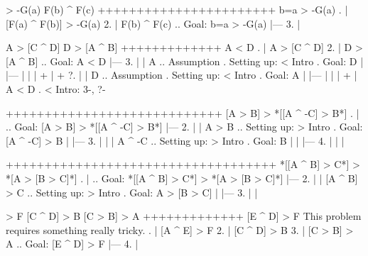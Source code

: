 \argument
 [F(a) ^ F(b)] > -G(a)
 F(b) ^ F(c)
+++++++++++++++++++++++
 b=a > -G(a)
\endargument
        \answer
        . | [F(a) ^ F(b)] > -G(a)
         2. | F(b) ^ F(c)    ..  Goal: b=a > -G(a)
            |---
         3. | 
        \endfitchproof
        \endanswer

\argument
 A > [C ^ D]
 D > [A ^ B]
+++++++++++++
 A < D
\endargument
        \answer
        . | A > [C ^ D]
         2. | D > [A ^ B]  ..  Goal: A < D
            |---
         3. |   | A        ..  Assumption  .  Setting up: < Intro  .  Goal: D
            |   |---
            |   | 
            |   +
            |   +
         ?. |   | D        ..  Assumption  .  Setting up: < Intro  .  Goal: A
            |   |---
            |   | 
            |   +
            | A < D        .  < Intro: 3-, ?-
        \endfitchproof
        \endanswer

\argument

++++++++++++++++++++++++++++
 [A > B] > *[[A ^ -C] > B*]
\endargument
        \answer
        . |                 ..  Goal: [A > B] > *[[A ^ -C] > B*]
            |---
         2. |   | A > B       ..  Setting up: > Intro  .  Goal: [A ^ -C] > B
            |   |---
         3. |   |   | A ^ -C  ..  Setting up: > Intro  .  Goal: B
            |   |   |---
         4. |   |   | 
        \endfitchproof
        \endanswer

\argument

+++++++++++++++++++++++++++++++++++
 *[[A ^ B] > C*] > *[A > [B > C]*]
\endargument
        \answer
        . |                    ..  Goal: *[[A ^ B] > C*] > *[A > [B > C]*]
            |---
         2. |   | [A ^ B] > C    ..  Setting up: > Intro  .  Goal: A > [B > C]
            |   |---
         3. |   | 
        \endfitchproof
        \endanswer

\argument
 [A ^ E] > F
 [C ^ D] > B
 [C > B] > A
+++++++++++++
 [E ^ D] > F
\endargument
\Hint This problem requires something really tricky.
        \answer
        . | [A ^ E] > F
         2. | [C ^ D] > B
         3. | [C > B] > A  ..  Goal: [E ^ D] > F
            |---
         4. | 
        \endfitchproof
        \endanswer

\endproblems
\bye
